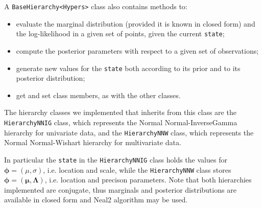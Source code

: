 \begin{itemize}
	A \verb|BaseHierarchy<Hypers>| class also contains methods to:
	\begin{itemize}
		\item evaluate the marginal distribution (provided it is known in closed form) and the log-likelihood in a given set of points, given the current \verb|state|;
		\item compute the posterior parameters with respect to a given set of observations;
		\item generate new values for the \verb|state| both according to its prior and to its posterior distribution;
		\item get and set class members, as with the other classes.
	\end{itemize}


The hierarchy classes we implemented that inherits from this class are the \verb|HierarchyNNIG| class, which represents the Normal Normal-InverseGamma hierarchy for univariate data, and the \verb|HierarchyNNW| class, which represents the Normal Normal-Wishart hierarchy for multivariate data.

In particular the \verb|state| in the \verb|HierarchyNNIG| class holds the values for $\boldsymbol\phi = (\mu,\sigma)$, i.e.  location and scale, while the \verb|HierarchyNNW| class stores $\boldsymbol\phi = (\mathbf{\mu},\mathbf{\Lambda})$, i.e. location and precison parameters.
Note that both hierarchies implemented are conjugate, thus marginals and
posterior distributions are available in closed form and Neal2 algorithm may be used.
	
	
\end{itemize}
